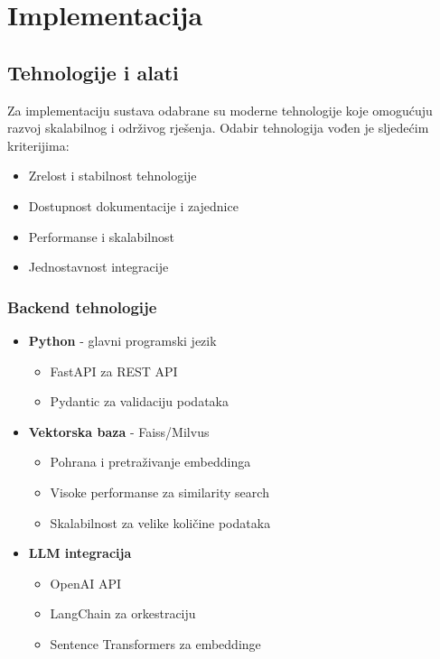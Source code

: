 \chapter{Implementacija}
\label{ch:implementation}


\section{Tehnologije i alati}
\label{sec:technologies}

Za implementaciju sustava odabrane su moderne tehnologije koje omogućuju razvoj 
skalabilnog i održivog rješenja. Odabir tehnologija vođen je sljedećim kriterijima:
\begin{itemize}
    \item Zrelost i stabilnost tehnologije
    \item Dostupnost dokumentacije i zajednice
    \item Performanse i skalabilnost
    \item Jednostavnost integracije
\end{itemize}

\subsection{Backend tehnologije}
\begin{itemize}
    \item \textbf{Python} - glavni programski jezik
    \begin{itemize}
        \item FastAPI za REST API
        \item Pydantic za validaciju podataka
    \end{itemize}
    
    \item \textbf{Vektorska baza} - Faiss/Milvus
    \begin{itemize}
        \item Pohrana i pretraživanje embeddinga
        \item Visoke performanse za similarity search
        \item Skalabilnost za velike količine podataka
    \end{itemize}
    
    \item \textbf{LLM integracija}
    \begin{itemize}
        \item OpenAI API
        \item LangChain za orkestraciju
        \item Sentence Transformers za embeddinge
    \end{itemize}
\end{itemize}

